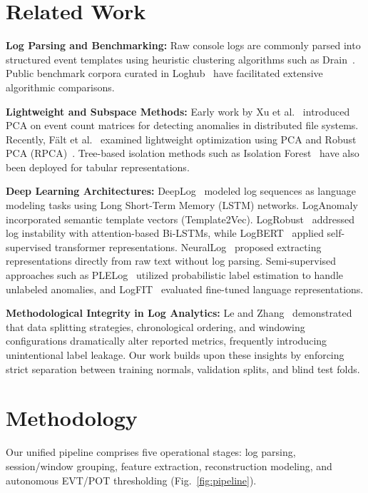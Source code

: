 \documentclass[conference]{IEEEtran}
\begin{document}
\section{Related Work}
\label{sec:related}
\textbf{Log Parsing and Benchmarking:} Raw console logs are commonly parsed into structured event templates using heuristic clustering algorithms such as Drain~\cite{he2017drain}. Public benchmark corpora curated in Loghub~\cite{he2023loghub,zhu2019tools} have facilitated extensive algorithmic comparisons.

\textbf{Lightweight and Subspace Methods:} Early work by Xu et al.~\cite{xu2009detecting} introduced PCA on event count matrices for detecting anomalies in distributed file systems. Recently, F{\"a}lt et al.~\cite{falt2025lightweight} examined lightweight optimization using PCA and Robust PCA (RPCA)~\cite{candes2011robust}. Tree-based isolation methods such as Isolation Forest~\cite{liu2008isolation} have also been deployed for tabular representations.

\textbf{Deep Learning Architectures:} DeepLog~\cite{du2017deeplog} modeled log sequences as language modeling tasks using Long Short-Term Memory (LSTM) networks. LogAnomaly~\cite{meng2019loganomaly} incorporated semantic template vectors (Template2Vec). LogRobust~\cite{zhang2019robust} addressed log instability with attention-based Bi-LSTMs, while LogBERT~\cite{guo2021logbert} applied self-supervised transformer representations. NeuralLog~\cite{le2021log} proposed extracting representations directly from raw text without log parsing. Semi-supervised approaches such as PLELog~\cite{yang2021semi} utilized probabilistic label estimation to handle unlabeled anomalies, and LogFIT~\cite{almodovar2024logfit} evaluated fine-tuned language representations.

\textbf{Methodological Integrity in Log Analytics:} Le and Zhang~\cite{le2022log} demonstrated that data splitting strategies, chronological ordering, and windowing configurations dramatically alter reported metrics, frequently introducing unintentional label leakage. Our work builds upon these insights by enforcing strict separation between training normals, validation splits, and blind test folds.

\section{Methodology}
\label{sec:method}
Our unified pipeline comprises five operational stages: log parsing, session/window grouping, feature extraction, reconstruction modeling, and autonomous EVT/POT thresholding (Fig.~\ref{fig:pipeline}).
\end{document}
